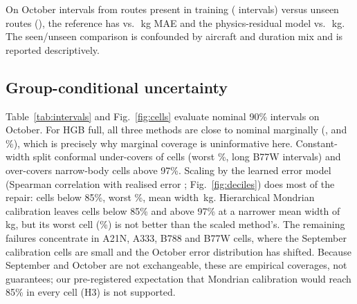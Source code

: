 \documentclass[runningheads]{llncs}
\begin{document}
\begin{table}[t]
\centering
\caption{Leave-one-aircraft-type-out MAE (kg) on the held-out type's September and October intervals. Bold marks the best model per row. The reference is HGB metadata+ADS-B.}
\label{tab:loto}
\scriptsize
\setlength{\tabcolsep}{3pt}
\resizebox{\linewidth}{!}{}
\end{table}

On October intervals from routes present in training (\seenRouteN{} intervals) versus unseen routes (\unseenRouteN{}), the reference has \seenRouteHgbMetadataAdsb{} vs.\ \unseenRouteHgbMetadataAdsb{}\,kg MAE and the physics-residual model \seenRouteHgbResidualPhysics{} vs.\ \unseenRouteHgbResidualPhysics{}\,kg. The seen/unseen comparison is confounded by aircraft and duration mix and is reported descriptively.

\subsection{Group-conditional uncertainty}
Table~\ref{tab:intervals} and Fig.~\ref{fig:cells} evaluate nominal 90\% intervals on October. For HGB full, all three methods are close to nominal marginally (\covHgbFullSplitConstant{}, \covHgbFullSplitScaled{} and \covHgbFullMondrianTypeDuration{}\%), which is precisely why marginal coverage is uninformative here. Constant-width split conformal under-covers \belowHgbFullSplitConstant{} of \eligibleCells{} cells (worst \worstHgbFullSplitConstant{}\%, long B77W intervals) and over-covers \aboveHgbFullSplitConstant{} narrow-body cells above 97\%. Scaling by the learned error model (Spearman correlation with realised error \spearmanHgbFull{}; Fig.~\ref{fig:deciles}) does most of the repair: \belowHgbFullSplitScaled{} cells below 85\%, worst \worstHgbFullSplitScaled{}\%, mean width \widthHgbFullSplitScaled{}\,kg. Hierarchical Mondrian calibration leaves \belowHgbFullMondrianTypeDuration{} cells below 85\% and \aboveHgbFullMondrianTypeDuration{} above 97\% at a narrower mean width of \widthHgbFullMondrianTypeDuration{}\,kg, but its worst cell (\worstHgbFullMondrianTypeDuration{}\%) is not better than the scaled method's. The remaining failures concentrate in A21N, A333, B788 and B77W cells, where the September calibration cells are small and the October error distribution has shifted. Because September and October are not exchangeable, these are empirical coverages, not guarantees; our pre-registered expectation that Mondrian calibration would reach 85\% in every cell (H3) is not supported.
\end{document}
